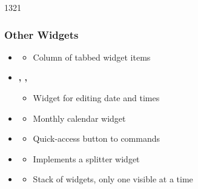  \begin{slide}{1321}\frametitle{Other Widgets}
   \begin{itemize}
   \item  \textbf{}
     \begin{itemize}
     \item Column of tabbed widget items
     \end{itemize}
   \item \textbf{, , }
     \begin{itemize}
     \item Widget for editing date and times
     \end{itemize}
   \item \textbf{}
     \begin{itemize}
     \item Monthly calendar widget
     \end{itemize}
   \item  \textbf{}
     \begin{itemize}
     \item Quick-access button to commands
     \end{itemize}
   \item \textbf{}
     \begin{itemize}
     \item Implements a splitter widget
     \end{itemize}
   \item \textbf{}
     \begin{itemize}
     \item Stack of widgets, only one visible at a time
     \end{itemize}
 \end{itemize}
\end{slide}
